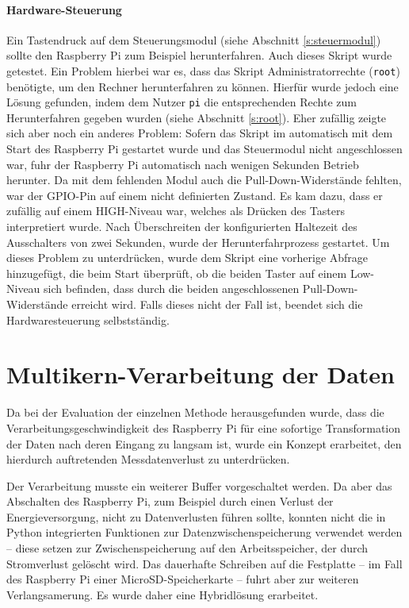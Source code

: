 \documentclass[a4paper,12pt,bibliography=totoc, listof=totoc,titlepage]{scrreprt}
\newcommand{\code}[1]{\texttt{#1}}
\begin{document}
\paragraph{Hardware-Steuerung}
Ein Tastendruck auf dem Steuerungsmodul (siehe Abschnitt \ref{s:steuermodul}) sollte den Raspberry Pi zum Beispiel herunterfahren. Auch dieses Skript wurde getestet. Ein Problem hierbei war es, dass das Skript Administratorrechte (\code{root}) benötigte, um den Rechner herunterfahren zu können. Hierfür wurde jedoch eine Lösung gefunden, indem dem Nutzer \code{pi} die entsprechenden Rechte zum Herunterfahren gegeben wurden (siehe Abschnitt \ref{s:root}). Eher zufällig zeigte sich aber noch ein anderes Problem: Sofern das Skript im automatisch mit dem Start des Raspberry Pi gestartet wurde und das Steuermodul nicht angeschlossen war, fuhr der Raspberry Pi automatisch nach wenigen Sekunden Betrieb herunter. Da mit dem fehlenden Modul auch die Pull-Down-Widerstände fehlten, war der GPIO-Pin auf einem nicht definierten Zustand. Es kam dazu, dass er zufällig auf einem HIGH-Niveau war, welches als Drücken des Tasters interpretiert wurde. Nach Überschreiten der konfigurierten Haltezeit des Ausschalters von zwei Sekunden, wurde der Herunterfahrprozess gestartet. Um dieses Problem zu unterdrücken, wurde dem Skript eine vorherige Abfrage hinzugefügt, die beim Start überprüft, ob die beiden Taster auf einem Low-Niveau sich befinden, dass durch die beiden angeschlossenen Pull-Down-Widerstände erreicht wird. Falls dieses nicht der Fall ist, beendet sich die Hardwaresteuerung selbstständig.

\section{Multikern-Verarbeitung der Daten}
\label{s:multikern}
Da bei der Evaluation der einzelnen Methode herausgefunden wurde, dass die Verarbeitungsgeschwindigkeit des Raspberry Pi für eine sofortige Transformation der Daten nach deren Eingang zu langsam ist, wurde ein Konzept erarbeitet, den hierdurch auftretenden Messdatenverlust zu unterdrücken.

Der Verarbeitung musste ein weiterer Buffer vorgeschaltet werden. Da aber das Abschalten des Raspberry Pi, zum Beispiel durch einen Verlust der Energieversorgung, nicht zu Datenverlusten führen sollte, konnten nicht die in Python integrierten Funktionen zur Datenzwischenspeicherung verwendet werden -- diese setzen zur Zwischenspeicherung auf den Arbeitsspeicher, der durch Stromverlust gelöscht wird. Das dauerhafte Schreiben auf die Festplatte -- im Fall des Raspberry Pi einer MicroSD-Speicherkarte -- fuhrt aber zur weiteren Verlangsamerung. Es wurde daher eine Hybridlösung erarbeitet.
\end{document}
